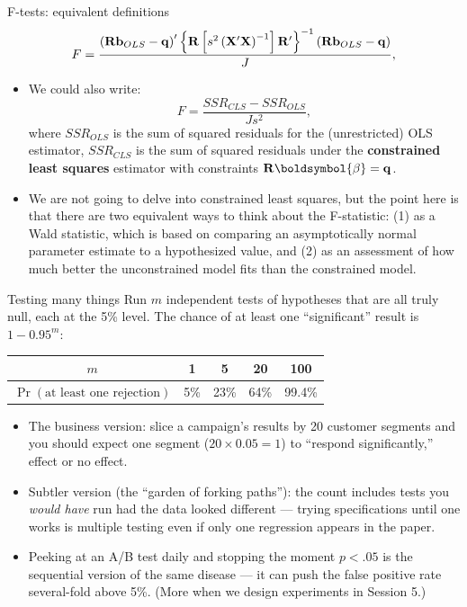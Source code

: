 \documentclass[aspectratio=169,11pt]{beamer}
\begin{document}
\begin{frame}{F-tests: equivalent definitions}
\[
F=\frac{\left({\bf R}{\bf b}_{OLS}-{\bf q}\right)'\left\{ {\bf R}\left[s^{2}\left({\bf X}'{\bf X}\right)^{-1}\right]{\bf R}'\right\} ^{-1}\left({\bf R}{\bf b}_{OLS}-{\bf q}\right)}{J},
\]
\begin{itemize}
	\item We could also write:\[
		F = \frac{SSR_{CLS} - SSR_{OLS}}{Js^2},
	\]
	where $SSR_{OLS}$ is the sum of squared residuals for the (unrestricted) OLS estimator, $SSR_{CLS}$
	is the sum of squared residuals under the {\bf constrained least squares} estimator with constraints ${\bf R} \boldsymbol{\beta} = {\bf q}$.

	\item We are not going to delve into constrained least squares, but the point here is that there are two equivalent ways to think about
	the F-statistic: (1) as a Wald statistic, which is based on comparing an asymptotically normal parameter estimate to a hypothesized value, 
	and (2) as an assessment of how much better the unconstrained model fits than the constrained model. 
\end{itemize}
\end{frame}





\begin{frame}{Testing many things}
Run $m$ independent tests of hypotheses that are \alert{all truly null}, each at the
5\% level. The chance of at least one ``significant'' result is $1 - 0.95^{m}$:
\begin{center}
\begin{tabular}{ccccc}
$m$ & 1 & 5 & 20 & 100 \\
\hline
$\Pr(\text{at least one rejection})$ & 5\% & 23\% & \alert{64\%} & 99.4\% \\
\end{tabular}
\end{center}
\bigskip
\begin{itemize}
	\item The business version: slice a campaign's results by 20 customer segments
	and you should \alert{expect} one segment ($20 \times 0.05 = 1$) to ``respond significantly,''
	effect or no effect.

	\item Subtler version (the ``garden of forking paths''): the count includes tests
	you \emph{would have} run had the data looked different --- trying specifications
	until one works is multiple testing even if only one regression appears in the
	paper.

	\item Peeking at an A/B test daily and stopping the moment $p < .05$ is the
	sequential version of the same disease --- it can push the false positive rate
	several-fold above 5\%. (More when we design experiments in Session 5.)
\end{itemize}
\end{frame}
\end{document}
